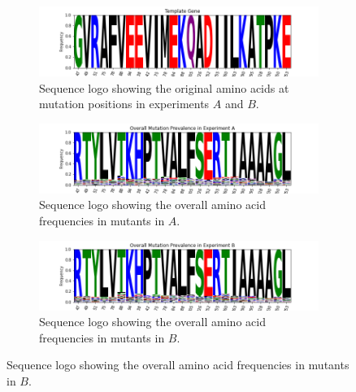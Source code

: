\documentclass[16pt]{book}
\begin{document}
\begin{figure}
	\caption{\label{logos} Sequence logos.}
\begin{subfigure}{\textwidth}
	\includegraphics[width=\textwidth]{img/template-logo.png}
	\caption{\label{logot} Sequence logo showing the original amino acids at mutation positions in experiments $A$ and $B$.}
\end{subfigure}
\begin{subfigure}{\textwidth}
	\includegraphics[width=\textwidth]{img/exp-a-logo.png}
	\caption{\label{logoa} Sequence logo showing the overall amino acid frequencies in mutants in $A$.}
\end{subfigure}
\begin{subfigure}{\textwidth}
	\includegraphics[width=\textwidth]{img/exp-b-logo.png}
	\caption{\label{logob} Sequence logo showing the overall amino acid frequencies in mutants in $B$.}
\end{subfigure}
\end{figure}
\end{document}
